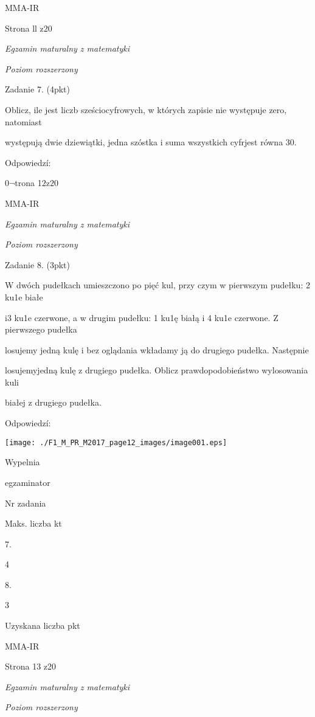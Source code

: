 \documentclass[a4paper,12pt]{article}
\begin{document}
MMA-IR

Strona ll z20





{\it Egzamin maturalny z matematyki}

{\it Poziom rozszerzony}

Zadanie 7. (4pkt)

Oblicz, ile jest liczb sześciocyfrowych, w których zapisie nie występuje zero, natomiast

występują dwie dziewiątki, jedna szóstka i suma wszystkich cyfrjest równa 30.

Odpowiedzí:

$ 0\neg$trona 1$2\mathrm{z}20$

MMA-IR





{\it Egzamin maturalny z matematyki}

{\it Poziom rozszerzony}

Zadanie 8. (3pkt)

W dwóch pudełkach umieszczono po pięć kul, przy czym w pierwszym pudełku: 2 ku1e białe

i3 ku1e czerwone, a w drugim pudełku: 1 ku1ę białą i 4 ku1e czerwone. Z pierwszego pudełka

losujemy jedną kulę i bez oglądania wkładamy ją do drugiego pudełka. Następnie

losujemyjedną kulę z drugiego pudełka. Oblicz prawdopodobieństwo wylosowania kuli

białej z drugiego pudełka.

Odpowiedzí:
\begin{center}
\texttt{[image: ./F1\_M\_PR\_M2017\_page12\_images/image001.eps]}
\end{center}
Wypelnia

egzaminator

Nr zadania

Maks. liczba kt

7.

4

8.

3

Uzyskana liczba pkt

MMA-IR

Strona 13 z20





{\it Egzamin maturalny z matematyki}

{\it Poziom rozszerzony}
\end{document}
